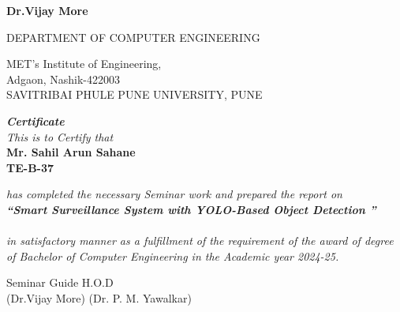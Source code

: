 \documentclass[openany,12pt]{report}
\begin{document}
\begin{titlepage}
\begin{center}
{\bf Dr.Vijay More}\\
\vspace{0.4in}


{\small DEPARTMENT OF COMPUTER ENGINEERING}\\
\begin{figure}[h]
\centerline{}
\label{atcres}
\end{figure}
{\large MET's Institute of Engineering,}\\
{\small Adgaon, Nashik-422003}\\
SAVITRIBAI PHULE PUNE UNIVERSITY, PUNE\\
\vspace{0.2in}

\end{center}
\end{titlepage}

\fontsize{14}{16}
\thispagestyle{empty}
\begin{center}
\begin{figure}[h]
\centerline{}
\label{atcres}
\end{figure}
\vspace{0.1in}
{\it \Huge  \textbf{Certificate}}\\
\vspace{0.2in}
{\it This is to Certify that}\\
\vspace{0.2in}
{\bf Mr. Sahil Arun Sahane}\hspace{0.32in}  \\
{\bf TE-B-37 }\hspace{0.3in}\\
\end{center}
\vspace{0.2in}
{\it has completed the necessary Seminar work and prepared the report on  \\

{\Large \bf ``Smart Surveillance System with YOLO-Based Object Detection
''}\\\\
{\it in satisfactory manner as a fulfillment of the
requirement of the award of degree of Bachelor
of Computer Engineering in the Academic year 2024-25.}\\
\vspace{0.2in}
\vspace{0.7in}
\noindent

\hspace{0.1in} Seminar Guide  \hspace{3.5in}H.O.D   \\
\hspace{4.6in} (Dr.Vijay More) \hspace{2.5in}(Dr. P. M. Yawalkar)\\
\vspace{0.4in}


}
\newpage {}
\end{document}
